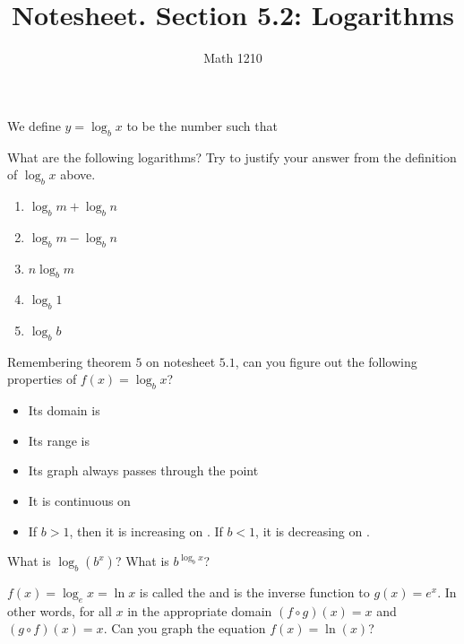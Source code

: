 \documentclass[12pt, a4paper]{article}
\author{Math 1210}
\title{Notesheet. Section 5.2: Logarithms}
\date{}
\begin{document}
\maketitle
\nameline
\begin{defi}
  We define \(y = \log_b x\) to be the number such that
\end{defi}
\begin{ex}
  What are the following logarithms? Try to justify your answer from
  the definition of \(\log_b x\) above.
  \begin{enumerate}
  \item \(\log_b m + \log_b n\)
  \item \(\log_b m - \log_b n\)
  \item \(n \log_b m\)
  \item \(\log_b 1\)
  \item \(\log_b b\)
  \end{enumerate}
\end{ex}
\vspace{-0.7in}
\begin{ex}
  Remembering theorem \(5\) on notesheet \(5.1\), can you figure
  out the following properties of \(f(x) = \log_b x\)?
  \begin{itemize}
  \item Its domain is
  \item Its range is
  \item Its graph always passes through the point
  \item It is continuous on
  \item If \(b > 1\), then it is increasing on \hspace{1in}. If
    \(b<1\), it is decreasing on \hspace{1in}.
  \end{itemize}
\end{ex}
\vspace{-2in}
\begin{ex}
  What is \(\log_b(b^x)\)? What is \(b^{\log_b x}\)?
\end{ex}
\vspace{-2in}
\begin{ex}
  \(f(x) = \log_e x = \ln x\) is called the  and is the
  inverse function to \(g(x) = e^x\). In other words, for all \(x\) in
  the appropriate domain \((f \circ g)(x) = x\) and \((g \circ f)(x) =
  x\). Can you graph the equation \(f(x) = \ln(x)\)?
\end{ex}
\vspace{-0.75in}
\end{document}
